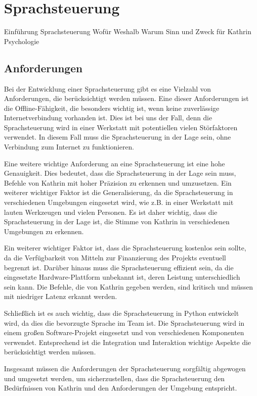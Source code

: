 \chapter{Sprachsteuerung}

Einführung Sprachsteuerung
Wofür
Weshalb
Warum
Sinn und Zweck für Kathrin
Psychologie

\section{Anforderungen}

Bei der Entwicklung einer Sprachsteuerung gibt es eine Vielzahl von Anforderungen, die berücksichtigt werden müssen. Eine dieser Anforderungen ist die Offline-Fähigkeit, die besonders wichtig ist, wenn keine zuverlässige Internetverbindung vorhanden ist. Dies ist bei uns der Fall, denn die Sprachsteuerung wird in einer Werkstatt mit potentiellen vielen Störfaktoren verwendet. In diesem Fall muss die Sprachsteuerung in der Lage sein, ohne Verbindung zum Internet zu funktionieren.

Eine weitere wichtige Anforderung an eine Sprachsteuerung ist eine hohe Genauigkeit. Dies bedeutet, dass die Sprachsteuerung in der Lage sein muss, Befehle von Kathrin mit hoher Präzision zu erkennen und umzusetzen. Ein weiterer wichtiger Faktor ist die Generalisierung, da die Sprachsteuerung in verschiedenen Umgebungen eingesetzt wird, wie z.B. in einer Werkstatt mit lauten Werkzeugen und vielen Personen. Es ist daher wichtig, dass die Sprachsteuerung in der Lage ist, die Stimme von Kathrin in verschiedenen Umgebungen zu erkennen.

Ein weiterer wichtiger Faktor ist, dass die Sprachsteuerung kostenlos sein sollte, da die Verfügbarkeit von Mitteln zur Finanzierung des Projekts eventuell begrenzt ist. Darüber hinaus muss die Sprachsteuerung effizient sein, da die eingesetzte Hardware-Plattform unbekannt ist, deren Leistung unterschiedlich sein kann. Die Befehle, die von Kathrin gegeben werden, sind kritisch und müssen mit niedriger Latenz erkannt werden.

Schließlich ist es auch wichtig, dass die Sprachsteuerung in Python entwickelt wird, da dies die bevorzugte Sprache im Team ist. Die Sprachsteuerung wird in einem großen Software-Projekt eingesetzt und von verschiedenen Komponenten verwendet. Entsprechend ist die Integration und Interaktion wichtige Aspekte die berücksichtigt werden müssen.

Insgesamt müssen die Anforderungen der Sprachsteuerung sorgfältig abgewogen und umgesetzt werden, um sicherzustellen, dass die Sprachsteuerung den Bedürfnissen von Kathrin und den Anforderungen der Umgebung entspricht.

